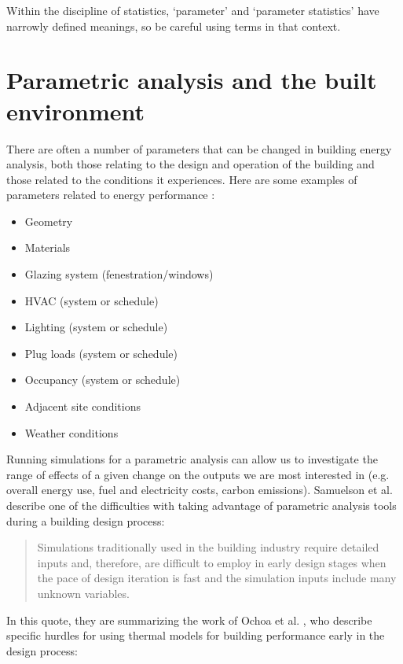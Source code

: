 \documentclass[10pt]{article}
\begin{document}
Within the discipline of statistics, `parameter' and `parameter statistics' have narrowly defined meanings, so be careful using terms in that context.


\section{Parametric analysis and the built environment}

There are often a number of parameters that can be changed in building energy analysis, both those relating to the design and operation of the building and those related to the conditions it experiences. Here are some examples of parameters related to energy performance  \cite{Shiel2018-xh}: 

\begin{itemize}
    \setlength{\itemsep}{0pt}%
    \setlength{\parskip}{0pt}%
    \item Geometry
    \item Materials
    \item Glazing system (fenestration/windows)
    \item HVAC (system or schedule)
    \item Lighting (system or schedule)
    \item Plug loads (system or schedule)
    \item Occupancy (system or schedule)
    \item Adjacent site conditions
    \item Weather conditions
\end{itemize}

Running simulations for a parametric analysis can allow us to investigate the range of effects of a given change on the outputs we are most interested in (e.g. overall energy use, fuel and electricity costs, carbon emissions). Samuelson et al. \cite{Samuelson2016-xw} describe one of the difficulties with taking advantage of parametric analysis tools during a building design process:

\begin{quote}
    Simulations traditionally used in the building industry require detailed inputs and, therefore, are difficult to employ in early design stages when the pace of design iteration is fast and the simulation inputs include many unknown variables. \cite{Samuelson2016-xw}
\end{quote}

In this quote, they are summarizing the work of Ochoa et al. \cite{Ochoa2009-pn}, who describe specific hurdles for using thermal models for building performance early in the design process:
\end{document}
